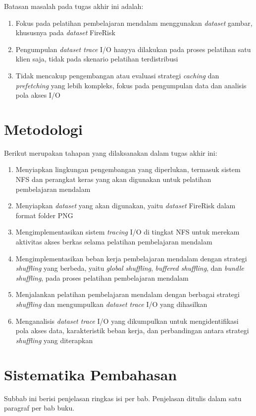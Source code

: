 Batasan masalah pada tugas akhir ini adalah:

\begin{enumerate}
    \item Fokus pada pelatihan pembelajaran mendalam menggunakan \textit{dataset} gambar, khususnya pada \textit{dataset} FireRisk
    \item Pengumpulan \textit{dataset trace} I/O hanyya dilakukan pada proses pelatihan satu klien saja, tidak pada skenario pelatihan terdistribusi
    \item Tidak mencakup pengembangan atau evaluasi strategi \textit{caching} dan \textit{prefetching} yang lebih kompleks, fokus pada pengumpulan data dan analisis pola akses I/O
\end{enumerate}


\section{Metodologi}

Berikut merupakan tahapan yang dilaksanakan dalam tugas akhir ini:

\begin{enumerate}
    \item Menyiapkan lingkungan pengembangan yang diperlukan, termasuk sistem NFS dan perangkat keras yang akan digunakan untuk pelatihan pembelajaran mendalam
    \item Menyiapkan \textit{dataset} yang akan digunakan, yaitu \textit{dataset} FireRisk dalam format folder PNG
    \item Mengimplementasikan sistem \textit{tracing} I/O di tingkat NFS untuk merekam aktivitas akses berkas selama pelatihan pembelajaran mendalam
    \item Mengimplementasikan beban kerja pembelajaran mendalam dengan strategi \textit{shuffling} yang berbeda, yaitu \textit{global shuffling}, \textit{buffered shuffling}, dan \textit{bundle shuffling}, pada proses pelatihan pembelajaran mendalam
    \item Menjalankan pelatihan pembelajaran mendalam dengan berbagai strategi \textit{shuffling} dan mengumpulkan \textit{dataset trace} I/O yang dihasilkan
    \item Menganalisis \textit{dataset trace} I/O yang dikumpulkan untuk mengidentifikasi pola akses data, karakteristik beban kerja, dan perbandingan antara strategi \textit{shuffling} yang diterapkan
\end{enumerate}

\section{Sistematika Pembahasan}
Subbab ini berisi penjelasan ringkas isi per bab. Penjelasan ditulis dalam satu paragraf per bab buku.
